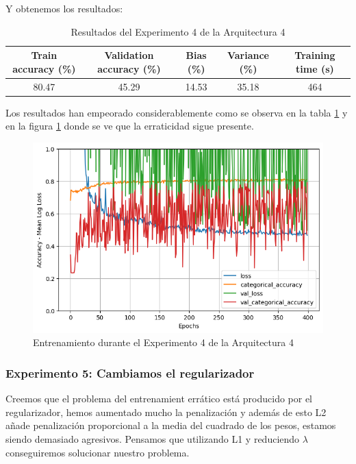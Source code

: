 \documentclass{article}
\begin{document}
			Y obtenemos los resultados:
			\begin{table}[!h]
				\begin{center}
					\begin{tabular}{| c | c | c | c | c |}
						\textbf{Train accuracy (\%)} & \textbf{Validation accuracy (\%)} & \textbf{Bias (\%)} & \textbf{Variance (\%)} & \textbf{Training time (s)} \\ \hline
						80.47 & 45.29 & 14.53 & 35.18 & 464 \\ \hline
					\end{tabular}
					\caption{Resultados del Experimento 4 de la Arquitectura 4}
					\label{tab:res-d-a4-e4}
				\end{center}
			\end{table}
			
			Los resultados han empeorado considerablemente como se observa en la tabla \ref{tab:res-d-a4-e4} y en la figura \ref{tr-d-a4-e4} donde se ve que la erraticidad sigue presente.
			\begin{figure}[!h]
				\begin{center}
					\includegraphics[scale=0.4]{d-tr-a4-e4.png}		
					\caption{Entrenamiento durante el Experimento 4 de la Arquitectura 4}	
					\label{tr-d-a4-e4}
				\end{center}
			\end{figure}
			\newpage
			
		\subsubsection{Experimento 5: Cambiamos el regularizador}
        \label{d-s-a4-e5}
			Creemos que el problema del entrenamient err\'atico est\'a producido por el regularizador, hemos aumentado mucho la penalizaci\'on y adem\'as de esto L2 a\~nade penalizaci\'on proporcional a la media del cuadrado de los pesos, estamos siendo demasiado agresivos. Pensamos que utilizando L1 y reduciendo $\lambda$ conseguiremos solucionar nuestro problema.
			
\end{document}
